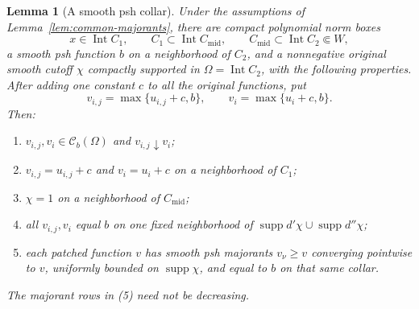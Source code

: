 \documentclass[11pt,a4paper]{article}
\numberwithin{equation}{section}
\newtheorem{lemma}[theorem]{Lemma}
\theoremstyle{definition}
\theoremstyle{remark}
\newcommand{\Cb}{\mathcal C_b}
\begin{document}
\begin{lemma}[A smooth psh collar]
\label{lem:smooth-collar}
Under the assumptions of Lemma~\ref{lem:common-majorants}, there are
compact polynomial norm boxes
\[
 x\in\operatorname{Int}C_1,\qquad
 C_1\subset\operatorname{Int}C_{\mathrm{mid}},\qquad
 C_{\mathrm{mid}}\subset\operatorname{Int}C_2\Subset W,
\]
a smooth psh function $b$ on a neighborhood of $C_2$, and a nonnegative
original smooth cutoff $\chi$ compactly supported in
$\Omega=\operatorname{Int}C_2$, with the following properties.
After adding one constant $c$ to all the original functions, put
\[
 v_{i,j}=\max\{u_{i,j}+c,b\},\qquad
 v_i=\max\{u_i+c,b\}.
\]
Then:
\begin{enumerate}
\item $v_{i,j},v_i\in\Cb(\Omega)$ and $v_{i,j}\downarrow v_i$;
\item $v_{i,j}=u_{i,j}+c$ and $v_i=u_i+c$ on a neighborhood of $C_1$;
\item $\chi=1$ on a neighborhood of $C_{\mathrm{mid}}$;
\item all $v_{i,j},v_i$ equal $b$ on one fixed neighborhood of
      $\operatorname{supp}d'\chi\cup\operatorname{supp}d''\chi$;
\item each patched function $v$ has smooth psh majorants $v_\nu\geq v$
      converging pointwise to $v$, uniformly bounded on $\operatorname{supp}\chi$,
      and equal to $b$ on that same collar.
\end{enumerate}
The majorant rows in (5) need not be decreasing.
\end{lemma}
\end{document}
